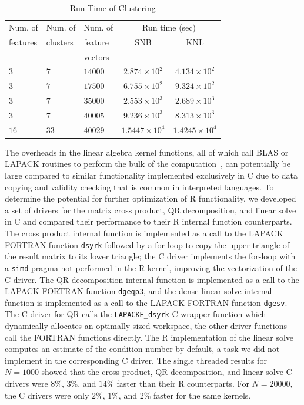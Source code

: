 \begin{table}
  \caption{Run Time of Clustering}
  \label{tab:clusterResults}
  \begin{tabular}{lllcc}
    \toprule
    Num. of   & Num. of   & Num. of & \multicolumn{2}{c}{Run time (sec)}\\
    features  & clusters  & feature           & SNB & KNL\\
              &           & vectors           & &\\
    \midrule
    $3$ & $7$ & $14000$ & $2.874\times 10^{2}$ & $4.134\times 10^{2}$ \\
    $3$ & $7$ & $17500$ & $6.755\times 10^{2}$ & $9.324\times 10^{2}$ \\
    $3$ & $7$ & $35000$ & $2.553\times 10^{3}$ & $2.689\times 10^{3}$ \\
    $3$ & $7$ & $40005$ & $9.236\times 10^{3}$ & $8.313\times 10^{3}$ \\
    $16$ & $33$ & $40029$ & $1.5447\times 10^{4}$ & $1.4245\times 10^{4}$ \\
    \bottomrule
  \end{tabular}
\end{table}

The overheads in the linear algebra kernel functions, all of which call BLAS or LAPACK
routines to perform the bulk of the computation~\cite{cran:Rmanuals}, can potentially be
large compared to similar functionality implemented exclusively in C due to data copying
and validity checking that is common in interpreted languages. To determine the potential
for further optimization of R functionality, we developed a set of drivers for the matrix
cross product, QR decomposition, and linear solve in C and compared their performance to
their R internal function counterparts. The cross product internal function is
implemented as a call to the LAPACK FORTRAN function \texttt{dsyrk} followed by a for-loop
to copy the upper triangle of the result matrix to its lower triangle; the C driver
implements the for-loop with a \texttt{simd} pragma not performed in the R kernel, improving
the vectorization of the C driver. The QR decomposition internal function is implemented as a call
to the LAPACK FORTRAN function \texttt{dgeqp3}, and the dense linear solve internal
function is implemented as a call to the LAPACK FORTRAN function \texttt{dgesv}. The C
driver for QR calls the \texttt{LAPACKE\_dsyrk} C wrapper function which dynamically
allocates an optimally sized workspace, the other driver functions call the FORTRAN
functions directly. The R implementation of the linear solve computes an estimate of the
condition number by default, a task we did not implement in the corresponding C driver.
The single threaded results for $N=1000$ showed that the cross product,
QR decomposition, and linear solve C drivers were $8\%$, $3\%$, and $14\%$ faster than their
R counterparts.  For $N=20000$, the C drivers were only $2\%$, $1\%$, and $2\%$ faster for
the same kernels.

